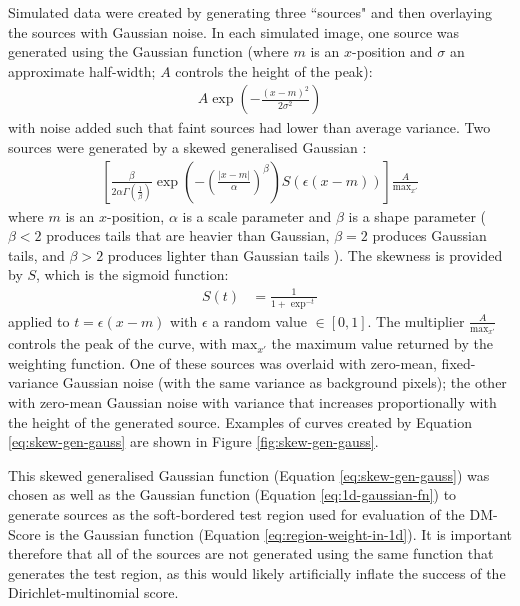 Simulated data were created by generating three ``sources" and then overlaying the sources with Gaussian noise. In each simulated image, one source was generated using the Gaussian function (where $m$ is an $x$-position and $\sigma$ an approximate half-width; $A$ controls the height of the peak):
\begin{align}
A \exp\left( -\frac{(x-m)^2}{2\sigma^2} \right) \label{eq:1d-gaussian-fn} 
\end{align}
with noise added such that faint sources had lower than average variance. Two sources were generated by a skewed generalised Gaussian \cite{nadarajah2005generalized}:
\begin{align}
\left[\frac{\beta}{2 \alpha \Gamma(\frac{1}{\beta})} 
\exp\left( -\left(\frac{|x-m|}{\alpha}\right)^{\beta}\right) 
S\left(\epsilon(x-m)\right)\right] \frac{A}{\text{max}_{x'}}
\label{eq:skew-gen-gauss} 
\end{align}
where $m$ is an $x$-position, $\alpha$ is a scale parameter and $\beta$ is a shape parameter ($\beta < 2$ produces tails that are heavier than Gaussian, $\beta=2$ produces Gaussian tails, and $\beta > 2$ produces lighter than Gaussian tails \cite{nadarajah2005generalized}). The skewness is provided by $S$, which is the sigmoid function:
\begin{align}
S(t) 
&= \frac{1}{1+\exp^{-t}}
\end{align}
applied to $t = \epsilon(x-m)$ with $\epsilon$ a random value $\in [0,1]$. The multiplier $\frac{A}{\text{max}_{x'}}$ controls the peak of the curve, with $\text{max}_{x'}$ the maximum value returned by the weighting function. One of these sources was overlaid with zero-mean, fixed-variance Gaussian noise (with the same variance as background pixels); the other with zero-mean Gaussian noise with variance that increases proportionally with the height of the generated source.  Examples of curves created by Equation \ref{eq:skew-gen-gauss} are shown in Figure \ref{fig:skew-gen-gauss}.

This skewed generalised Gaussian function (Equation \ref{eq:skew-gen-gauss}) was chosen as well as the Gaussian function (Equation \ref{eq:1d-gaussian-fn}) to generate sources as the soft-bordered test region used for evaluation of the DM-Score is the Gaussian function (Equation \ref{eq:region-weight-in-1d}). It is important therefore that all of the sources are not generated using the same function that generates the test region, as this would likely artificially inflate the success of the Dirichlet-multinomial score.  

